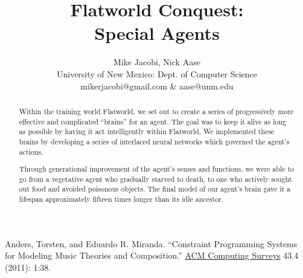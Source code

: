 \documentclass[12pt]{article}
\title{{\bf Flatworld Conquest:\\
    Special Agents}}
\author{Mike Jacobi, Nick Aase\\
University of New Mexico: Dept. of Computer Science\\
\normalsize  mikerjacobi@gmail.com \& aase@unm.edu}
\date{}
\begin{document}
\begin{sloppypar}

\maketitle



\renewcommand{\abstractname}{\Large Abstract}
\begin{abstract}
  \begin{singlespace}
    Within the training world Flatworld, we set out to create a series of 
    progressively more effective and complicated ``brains'' for an agent.
    The goal was to keep it alive as long as possible by having it act 
    intelligently within Flatworld. We implemented these brains by developing 
    a series of interlaced neural networks which governed the agent's actions.

    Through generational improvement of the agent's senses and functions,
    we were able to go from a vegetative agent who gradually starved to death,
    to one who actively sought out food and avoided poisonous objects. The
    final model of our agent's brain gave it a lifespan approximately 
    fifteen times longer than its idle ancestor.
  \end{singlespace}
\end{abstract}









\end{sloppypar}

\begin{thebibliography}{9}

  Anders, Torsten, and Eduardo R. Miranda. ``Constraint Programming Systems for Modeling Music Theories and Composition.'' \underline{ACM Computing Surveys} 43.4 (2011): 1:38.

\end{thebibliography}
\end{document}
